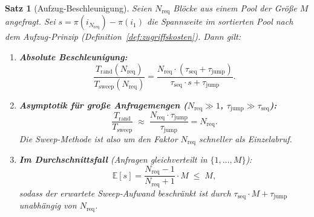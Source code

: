 ﻿\documentclass[a4paper,12pt]{article}
\theoremstyle{definition}
\theoremstyle{plain}
\newtheorem{satz}{Satz}[section]
\begin{document}
\begin{satz}[Aufzug-Beschleunigung]
\label{satz:elevator}
  Seien $N_{\mathrm{req}}$ Blöcke aus einem Pool der Größe $M$ angefragt.
  Sei $s = \pi(i_{N_{\mathrm{req}}}) - \pi(i_1)$ die Spannweite im
  sortierten Pool nach dem Aufzug-Prinzip (Definition~\ref{def:zugriffskosten}).
  Dann gilt:

  \begin{enumerate}
    \item \textbf{Absolute Beschleunigung:}
      \[
        \frac{T_{\mathrm{rand}}(N_{\mathrm{req}})}{T_{\mathrm{sweep}}(N_{\mathrm{req}})}
        = \frac{N_{\mathrm{req}} \cdot (\tau_{\mathrm{seq}} + \tau_{\mathrm{jump}})}
               {\tau_{\mathrm{seq}} \cdot s + \tau_{\mathrm{jump}}}.
      \]

    \item \textbf{Asymptotik für große Anfragemengen ($N_{\mathrm{req}} \gg 1$,
      $\tau_{\mathrm{jump}} \gg \tau_{\mathrm{seq}}$):}
      \[
        \frac{T_{\mathrm{rand}}}{T_{\mathrm{sweep}}}
        \;\approx\;
        \frac{N_{\mathrm{req}} \cdot \tau_{\mathrm{jump}}}{\tau_{\mathrm{jump}}}
        = N_{\mathrm{req}}.
      \]
      Die Sweep-Methode ist also um den Faktor $N_{\mathrm{req}}$ schneller
      als Einzelabruf.

    \item \textbf{Im Durchschnittsfall} (Anfragen gleichverteilt in
      $\{1, \ldots, M\}$):
      \[
        \mathbb{E}[s] = \frac{N_{\mathrm{req}} - 1}{N_{\mathrm{req}} + 1}
        \cdot M \;\le\; M,
      \]
      sodass der erwartete Sweep-Aufwand beschränkt ist durch
      $\tau_{\mathrm{seq}} \cdot M + \tau_{\mathrm{jump}}$
      unabhängig von $N_{\mathrm{req}}$.
  \end{enumerate}
\end{satz}
\end{document}

